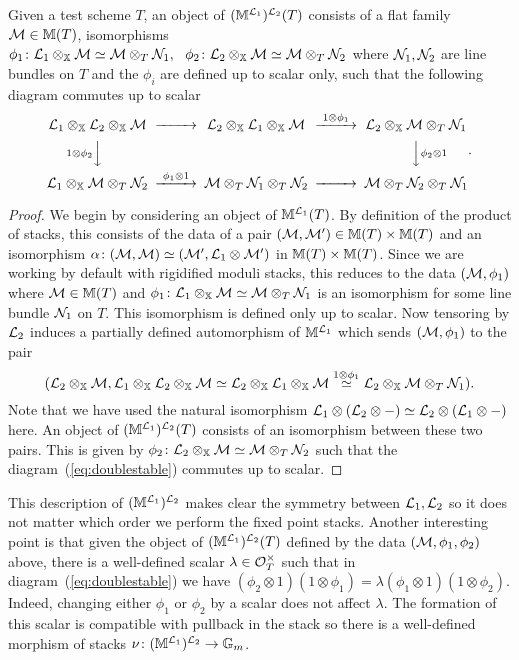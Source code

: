 \documentclass[12pt]{amsart}
\begin{document}
\begin{proposition}  \label{prop:doublestable}
Given a test scheme $T$, an object of $(\mathbb{M}^{\mathcal{L}_1})^{\mathcal{L}_2}(T)$ consists of a flat family $\mathcal{M} \in \mathbb{M}(T)$, isomorphisms $\phi_1 \colon \mathcal{L}_1 \otimes_{\mathbb{X}} \mathcal{M} \simeq \mathcal{M} \otimes_T \mathcal{N}_1, \ \ \phi_2 \colon \mathcal{L}_2 \otimes_{\mathbb{X}} \mathcal{M} \simeq \mathcal{M} \otimes_T \mathcal{N}_2$ where $\mathcal{N}_1, \mathcal{N}_2$ are line bundles on $T$ and the $\phi_i$ are defined up to scalar only, such that the following diagram commutes up to scalar
\begin{equation} \label{eq:doublestable}
\begin{CD}
\cL_1 \otimes_{\bX} \cL_2 \otimes_{\bX} \cM @>>> \cL_2 \otimes_{\bX} \cL_1 \otimes_{\bX} \cM @>{1 \otimes \phi_1}>> \cL_2 \otimes_{\bX} \cM \otimes_T \cN_1 \\
@V{1 \otimes \phi_2}VV @. @VV{\phi_2 \otimes 1}V \\
\cL_1 \otimes_{\bX} \cM \otimes_T \cN_2 @>{\phi_1 \otimes 1}>> \cM \otimes_T \cN_1 \otimes_T \cN_2 @>>> 
\cM \otimes_T \cN_2 \otimes_T \cN_1
\end{CD}.
\end{equation}
\end{proposition}
\begin{proof}
We begin by considering an object of $\mathbb{M}^{\mathcal{L}_1}(T)$. By definition of the product of stacks, this consists of the data of a pair $(\mathcal{M}, \mathcal{M}') \in \mathbb{M}(T) \times\mathbb{M}(T)$ and an isomorphism $\alpha \colon (\mathcal{M}, \mathcal{M}) \simeq (\mathcal{M}', \mathcal{L}_1 \otimes \mathcal{M}')$ in $\mathbb{M}(T) \times \mathbb{M}(T)$. Since we are working by default with rigidified moduli stacks, this reduces to the data $(\mathcal{M}, \phi_1)$ where $\mathcal{M} \in \mathbb{M}(T)$ and $\phi_1 \colon \mathcal{L}_1 \otimes_{\mathbb{X}} \mathcal{M} \simeq \mathcal{M} \otimes_T \mathcal{N}_1$ is an isomorphism for some line bundle $\mathcal{N}_1$ on $T$. This isomorphism is defined only up to scalar. Now tensoring by $\mathcal{L}_2$ induces a partially defined automorphism of $\mathbb{M}^{\mathcal{L}_1}$ which sends $(\mathcal{M},\phi_1)$ to the pair 
$$(\mathcal{L}_2 \otimes_{\mathbb{X}} \mathcal{M}, \mathcal{L}_1 \otimes_{\mathbb{X}} \mathcal{L}_2 \otimes_{\mathbb{X}} \mathcal{M} \simeq \mathcal{L}_2 \otimes_{\mathbb{X}} \mathcal{L}_1 \otimes_{\mathbb{X}} \mathcal{M} \stackrel{1 \otimes \phi_1}{\simeq} \mathcal{L}_2 \otimes_{\mathbb{X}} \mathcal{M} \otimes_T \mathcal{N}_1).$$
Note that we have used the natural isomorphism $\mathcal{L}_1 \otimes (\mathcal{L}_2 \otimes -) \simeq \mathcal{L}_2 \otimes (\mathcal{L}_1 \otimes -)$ here. An object of $(\mathbb{M}^{\mathcal{L}_1})^{\mathcal{L}_2}(T)$ consists of an isomorphism between these two pairs. This is given by $\phi_2 \colon \mathcal{L}_2 \otimes_{\mathbb{X}} \mathcal{M} \simeq \mathcal{M} \otimes_T \mathcal{N}_2$ such that the diagram~(\ref{eq:doublestable}) commutes up to scalar.
\end{proof}
This description of $(\mathbb{M}^{\mathcal{L}_1})^{\mathcal{L}_2}$ makes clear the symmetry between $\mathcal{L}_1, \mathcal{L}_2$ so it does not matter which order we perform the fixed point stacks. Another interesting point is that given the object of $(\mathbb{M}^{\mathcal{L}_1})^{\mathcal{L}_2}(T)$ defined by the data $(\mathcal{M}, \phi_1, \phi_2)$ above, there is a well-defined scalar $\lambda \in \mathcal{O}_T^{\times}$ such that in diagram~(\ref{eq:doublestable}) we have $(\phi_2 \otimes 1) (1 \otimes \phi_1) = \lambda (\phi_1 \otimes 1) (1 \otimes \phi_2)$. Indeed, changing either $\phi_1$ or 
$\phi_2$ by a scalar does not affect $\lambda$. The formation of this scalar is compatible with pullback in the stack so there is a well-defined morphism of stacks $\nu \colon (\mathbb{M}^{\mathcal{L}_1})^{\mathcal{L}_2} \rightarrow \mathbb{G}_m$. 
\end{document}
